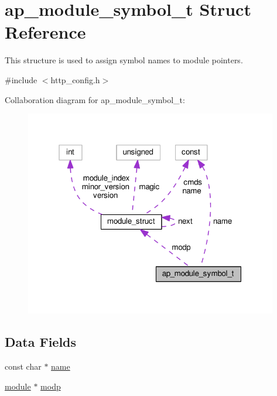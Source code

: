\hypertarget{structap__module__symbol__t}{}\section{ap\+\_\+module\+\_\+symbol\+\_\+t Struct Reference}
\label{structap__module__symbol__t}


This structure is used to assign symbol names to module pointers.  




{\ttfamily \#include $<$http\+\_\+config.\+h$>$}



Collaboration diagram for ap\+\_\+module\+\_\+symbol\+\_\+t\+:
\nopagebreak
\begin{figure}[H]
\begin{center}
\leavevmode
\includegraphics[width=313pt]{structap__module__symbol__t__coll__graph}
\end{center}
\end{figure}
\subsection*{Data Fields}
\begin{DoxyCompactItemize}
\item 
const char $\ast$ \hyperlink{structap__module__symbol__t_af1f2cf8f12dac28f9fdb54fc376e9b5b}{name}
\item 
\hyperlink{group__APACHE__CORE__CONFIG_ga0ea4f633a5f9f88e1603aaeb1f2b2e69}{module} $\ast$ \hyperlink{structap__module__symbol__t_a795db84f5d690fd488d57a1015ca0682}{modp}
\end{DoxyCompactItemize}


